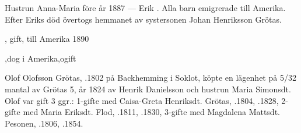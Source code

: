 Hustrun Anna-Maria \textdied före år 1887  ---  Erik . Alla barn emigrerade till Amerika. Efter Eriks död övertogs hemmanet av systersonen Johan Henriksson Grötas.
\begin{jhchildren}
  \item {}
  \item {}
  \item {}
  \item {}, gift, till Amerika 1890
  \item {}
  \item {}
  \item {},dog i Amerika,ogift
\end{jhchildren}


%
Olof Olofsson Grötas, .1802 på Backhemming i Soklot, köpte en lägenhet på 5/32 mantal av Grötas 5, år 1824 av Henrik Danielsson och hustrun Maria Simonsdt. Olof var gift 3 ggr.: 1-gifte med Caisa-Greta Henriksdt. Grötas, .1804, .1828, 2-gifte med Maria Eriksdt. Flod, .1811, .1830, 3-gifte med Magdalena Mattsdt. Pesonen, .1806, .1854.

